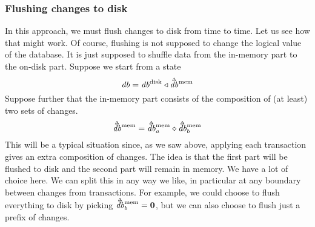 \documentclass[11pt,a4paper]{article}
\newcommand\deltavar[1]{\accentset{\Delta}{#1}}
\begin{document}
\subsubsection{Flushing changes to disk}
In this approach, we must flush changes to disk from time to time. Let us see
how that might work. Of course, flushing is not supposed to change the logical
value of the database. It is just supposed to shuffle data from the in-memory
part to the on-disk part. Suppose we start from a state
\[
\mathit{db} = \mathit{db}^{\mathrm{disk}}
      \triangleleft \deltavar{\mathit{db}}^{\mathrm{mem}}
\]
Suppose further that the in-memory part consists of the composition of (at
least) two sets of changes.
\[
\deltavar{\mathit{db}}^{\mathrm{mem}} = \deltavar{\mathit{db}}^{\mathrm{mem}}_a \diamond \deltavar{\mathit{db}}^{\mathrm{mem}}_b
\]
This will be a typical situation since, as we saw above, applying each
transaction gives an extra composition of changes. The idea is that the first
part will be flushed to disk and the second part will remain in memory. We have
a lot of choice here. We can split this in any way we like, in particular at
any boundary between changes from transactions. For example, we could choose to flush
everything to disk by picking
$\deltavar{\mathit{db}}^{\mathrm{mem}}_b = \mathbf{0}$,
but we can also choose to flush just a prefix of changes.
\end{document}
